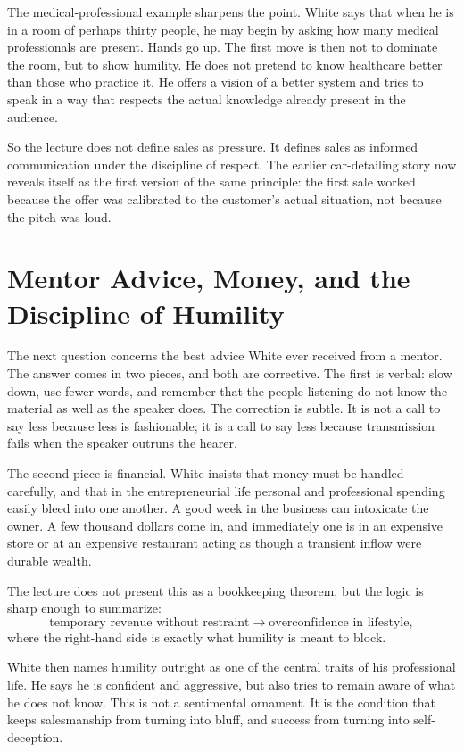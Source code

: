 The medical-professional example sharpens the point. White says that when he is in a room of perhaps thirty people, he may begin by asking how many medical professionals are present. Hands go up. The first move is then not to dominate the room, but to show humility. He does not pretend to know healthcare better than those who practice it. He offers a vision of a better system and tries to speak in a way that respects the actual knowledge already present in the audience.

So the lecture does not define sales as pressure. It defines sales as informed communication under the discipline of respect. The earlier car-detailing story now reveals itself as the first version of the same principle: the first sale worked because the offer was calibrated to the customer's actual situation, not because the pitch was loud.

\section{Mentor Advice, Money, and the Discipline of Humility}

The next question concerns the best advice White ever received from a mentor. The answer comes in two pieces, and both are corrective. The first is verbal: slow down, use fewer words, and remember that the people listening do not know the material as well as the speaker does. The correction is subtle. It is not a call to say less because less is fashionable; it is a call to say less because transmission fails when the speaker outruns the hearer.

The second piece is financial. White insists that money must be handled carefully, and that in the entrepreneurial life personal and professional spending easily bleed into one another. A good week in the business can intoxicate the owner. A few thousand dollars come in, and immediately one is in an expensive store or at an expensive restaurant acting as though a transient inflow were durable wealth.

The lecture does not present this as a bookkeeping theorem, but the logic is sharp enough to summarize:
\begin{equation}
\text{temporary revenue without restraint} \to \text{overconfidence in lifestyle},
\end{equation}
where the right-hand side is exactly what humility is meant to block.

White then names humility outright as one of the central traits of his professional life. He says he is confident and aggressive, but also tries to remain aware of what he does not know. This is not a sentimental ornament. It is the condition that keeps salesmanship from turning into bluff, and success from turning into self-deception.

